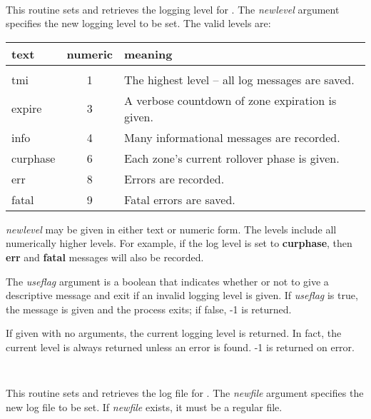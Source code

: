 \begin{description}

\item {}\verb" "

This routine sets and retrieves the logging level for .
The {\it newlevel} argument specifies the new logging level to be set.  The
valid levels are:

\begin{table}[ht]
\begin{center}
\begin{tabular}{lcl}
text & numeric & meaning	\\
\hline				\\
tmi       & 1 & The highest level -- all log messages are saved.	\\
expire    & 3 & A verbose countdown of zone expiration is given.	\\
info      & 4 & Many informational messages are recorded.		\\
curphase  & 6 & Each zone's current rollover phase is given.		\\
err       & 8 & Errors are recorded.					\\
fatal     & 9 & Fatal errors are saved.					\\
\end{tabular} 
\end{center}
\end{table}

{\it newlevel} may be given in either text or numeric form.  The levels
include all numerically higher levels.  For example, if the log level is set
to {\bf curphase}, then {\bf err} and {\bf fatal} messages will also be
recorded.

The {\it useflag} argument is a boolean that indicates whether or not to give
a descriptive message and exit if an invalid logging level is given.  If {\it
useflag} is true, the message is given and the process exits; if false, -1 is
returned.

If given with no arguments, the current logging level is returned.  In fact,
the current level is always returned unless an error is found.  -1 is returned
on error.

\item {}\verb" "

This routine sets and retrieves the log file for .  The {\it
newfile} argument specifies the new log file to be set.  If {\it newfile}
exists, it must be a regular file.


\end{description}
